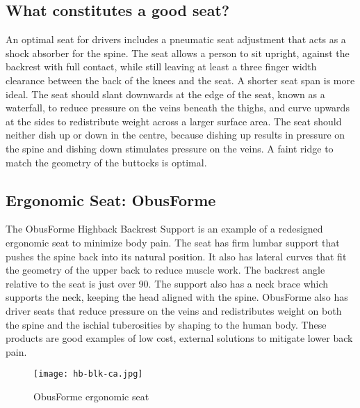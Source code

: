 \documentclass[11pt]{article}
\begin{document}
\subsection{What constitutes a good seat?}
An optimal seat for drivers includes a pneumatic seat adjustment that acts as a shock absorber for the spine. The seat 
allows a person to sit upright, against the backrest with full contact, while still leaving at least a 
three finger width clearance between the back of the knees and the seat. A shorter seat span is more ideal. 
The seat should slant downwards at the edge of the seat, known as a waterfall, to reduce pressure on the veins 
beneath the thighs, and curve upwards at the sides to redistribute weight across a larger surface area. 
The seat should neither dish 
up or down in the centre, because dishing up results in pressure on the spine and dishing down stimulates pressure on the veins. 
A faint ridge to match the geometry of the buttocks is optimal\cite{ergoCentricchair2011, Natpost2005}.


\subsection{Ergonomic Seat: ObusForme}
The ObusForme Highback Backrest Support is an example of a redesigned ergonomic seat to minimize body pain. 
The seat has firm lumbar support that pushes the spine back into its natural position. 
It also has lateral curves that fit the geometry of the upper back to reduce muscle work\cite{ObusFormebackrest}. 
The backrest angle relative to the seat is just over 90\textdegree. The support also has a neck brace which supports
the neck, keeping the head aligned with the spine\cite{ObusFormedriverchair}.
ObusForme also has driver seats that reduce pressure on the veins and redistributes weight 
on both the spine and the ischial tuberosities by shaping to the human
body\cite{ObusFormecushion}. These products are good examples of low
cost, external solutions to mitigate lower back pain.
\begin{figure}[h]
  \centering
  \texttt{[image: hb-blk-ca.jpg]}
  \caption{ObusForme ergonomic seat}
\end{figure}
\end{document}
